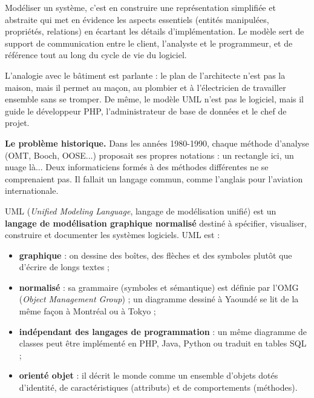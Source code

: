 \documentclass[11pt]{article}
\newcommand{\cle}[1]{{\popxbold\color{popdark}#1}}
\newcounter{popsec}
\newcounter{popsub}
\newcommand{\courssub}[1]{%
  \stepcounter{popsub}%
  \par\vspace{9pt}\noindent{\popxbold\fontsize{11.5}{13}\selectfont\color{popink}{\color{poporange}\thepopsec.\thepopsub}\hspace{6pt}#1}\par\nopagebreak\vspace{4pt}
}
\begin{document}
\begin{definition}
\cle{Modéliser} un système, c'est en construire une représentation simplifiée et abstraite qui met en évidence les aspects essentiels (entités manipulées, propriétés, relations) en écartant les détails d'implémentation. Le modèle sert de support de communication entre le client, l'analyste et le programmeur, et de référence tout au long du cycle de vie du logiciel.
\end{definition}

L'analogie avec le bâtiment est parlante : le plan de l'architecte n'est pas la maison, mais il permet au maçon, au plombier et à l'électricien de travailler ensemble sans se tromper. De même, le modèle UML n'est pas le logiciel, mais il guide le développeur PHP, l'administrateur de base de données et le chef de projet.

\courssub{UML : un langage graphique normalisé}

\textbf{Le problème historique.} Dans les années 1980-1990, chaque méthode d'analyse (OMT, Booch, OOSE...) proposait ses propres notations : un rectangle ici, un nuage là... Deux informaticiens formés à des méthodes différentes ne se comprenaient pas. Il fallait un langage commun, comme l'anglais pour l'aviation internationale.

\begin{definition}[UML]
\cle{UML} (\emph{Unified Modeling Language}, langage de modélisation unifié) est un \textbf{langage de modélisation graphique normalisé} destiné à spécifier, visualiser, construire et documenter les systèmes logiciels. UML est :
\begin{itemize}
\item \textbf{graphique} : on dessine des boîtes, des flèches et des symboles plutôt que d'écrire de longs textes ;
\item \textbf{normalisé} : sa grammaire (symboles et sémantique) est définie par l'\cle{OMG} (\emph{Object Management Group}) ; un diagramme dessiné à Yaoundé se lit de la même façon à Montréal ou à Tokyo ;
\item \textbf{indépendant des langages de programmation} : un même diagramme de classes peut être implémenté en PHP, Java, Python ou traduit en tables SQL ;
\item \textbf{orienté objet} : il décrit le monde comme un ensemble d'objets dotés d'identité, de caractéristiques (attributs) et de comportements (méthodes).
\end{itemize}
\end{definition}
\end{document}
